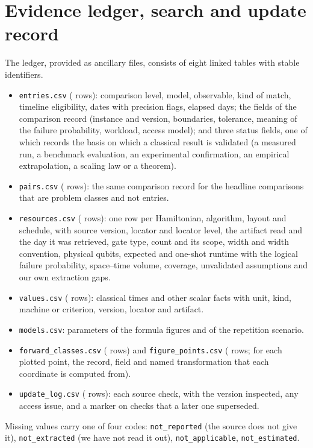 \documentclass[10pt,a4paper]{article}
\begin{document}
\section{Evidence ledger, search and update record}
\label{app:ledger}
The ledger, provided as ancillary files, consists of eight linked tables with stable identifiers.
\begin{itemize}
\item \texttt{entries.csv} (\nEntries{} rows): comparison level, model, observable, kind of match, timeline eligibility, dates with precision flags, elapsed days; the fields of the comparison record (instance and version, boundaries, tolerance, meaning of the failure probability, workload, access model); and three status fields, one of which records the basis on which a classical result is validated (a measured run, a benchmark evaluation, an experimental confirmation, an empirical extrapolation, a scaling law or a theorem).
\item \texttt{pairs.csv} (\nPairs{} rows): the same comparison record for the headline comparisons that are problem classes and not entries.
\item \texttt{resources.csv} (\nResources{} rows): one row per Hamiltonian, algorithm, layout and schedule, with source version, locator and locator level, the artifact read and the day it was retrieved, gate type, count and its scope, width and width convention, physical qubits, expected and one-shot runtime with the logical failure probability, space--time volume, coverage, unvalidated assumptions and our own extraction gaps.
\item \texttt{values.csv} (\nValues{} rows): classical times and other scalar facts with unit, kind, machine or criterion, version, locator and artifact.
\item \texttt{models.csv}: parameters of the formula figures and of the repetition scenario.
\item \texttt{forward\_classes.csv} (\nClasses{} rows) and \texttt{figure\_points.csv} (\nPoints{} rows; for each plotted point, the record, field and named transformation that each coordinate is computed from).
\item \texttt{update\_log.csv} (\nLog{} rows): each source check, with the version inspected, any access issue, and a marker on checks that a later one superseded.
\end{itemize}
Missing values carry one of four codes: \texttt{not\_reported} (the source does not give it), \texttt{not\_extracted} (we have not read it out), \texttt{not\_applicable}, \texttt{not\_estimated}.
\end{document}

